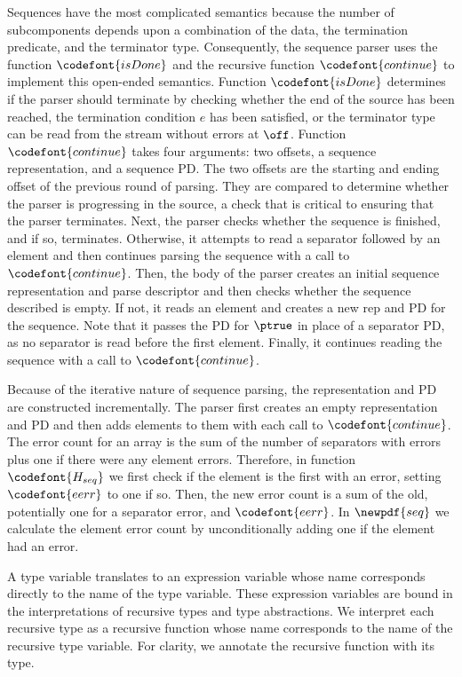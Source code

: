 Sequences have the most complicated semantics because the number of
subcomponents depends upon a combination of the data, the termination
predicate, and the terminator type. Consequently, the sequence parser
uses the function $\codefont{isDone}$ and the recursive function
$\codefont{continue}$ to implement this open-ended semantics.
Function $\codefont{isDone}$ determines if the parser should terminate
by checking whether the end of the source has been reached, the
termination condition $e$ has been satisfied, or the terminator type
can be read from the stream without errors at $\off$.  Function
$\codefont{continue}$ takes four arguments: two offsets, a sequence
representation, and a sequence PD.  The two offsets are the starting
and ending offset of the previous round of parsing. They are compared
to determine whether the parser is progressing in the source, a check
that is critical to ensuring that the parser terminates. Next, the
parser checks whether the sequence is finished, and if so, terminates.
Otherwise, it attempts to read a separator followed by an element and
then continues parsing the sequence with a call to
$\codefont{continue}$.  Then, the body of the parser creates an
initial sequence representation and parse descriptor and then checks
whether the sequence described is empty. If not, it reads an element
and creates a new rep and PD for the sequence.  Note that it passes
the PD for $\ptrue$ in place of a separator PD, as no separator is
read before the first element.  Finally, it continues reading the
sequence with a call to $\codefont{continue}$.

Because of the iterative nature of sequence parsing, the
representation and PD are constructed incrementally. The parser first
creates an empty representation and PD and then adds elements to them
with each call to $\codefont{continue}$. The error count for an array
is the sum of the number of separators with errors plus one if there
were any element errors. Therefore, in function ${\codefont{H_{seq}}}$
we first check if the element is the first with an error, setting
$\codefont{eerr}$ to one if so. Then, the new error count is a sum of
the old, potentially one for a separator error, and $\codefont{eerr}$.
In $\newpdf{seq}$ we calculate the element error count by
unconditionally adding one if the element had an error.

A type variable translates to an expression variable whose name
corresponds directly to the name of the type variable. These
expression variables are bound in the interpretations of recursive
types and type abstractions. We interpret each recursive type as a
recursive function whose name corresponds to the name of the recursive
type variable. For clarity, we annotate the recursive function with its
type.

